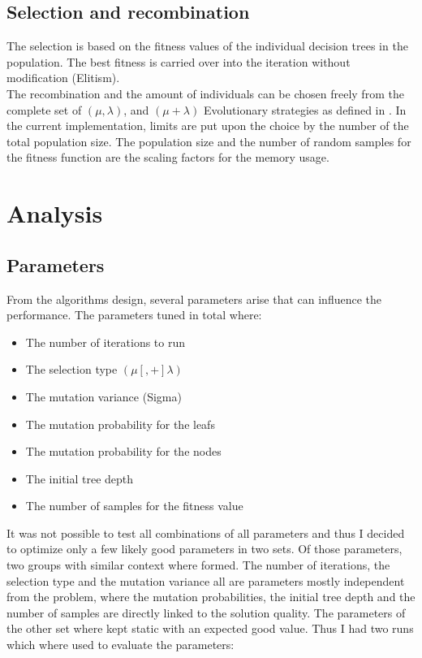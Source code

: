 \documentclass[conference]{IEEEtran}
\begin{document}
\subsection{Selection and recombination}
The selection is based on the fitness values of the individual decision trees in the population. The best fitness is carried over into the iteration without modification (Elitism).\\
The recombination and the amount of individuals can be chosen freely from the complete set of $(\mu ,\lambda)$, and $(\mu + \lambda)$ Evolutionary strategies as defined in \cite{rozenberg2011handbook}. In the current implementation, limits are put upon the choice by the number of the total population size. The population size and the number of random samples for the fitness function are the scaling factors for the memory usage. 


\section{Analysis}
\subsection{Parameters}
From the algorithms design, several parameters arise that can influence the performance. The parameters tuned in total where:

\begin{itemize}
\item The number of iterations to run
\item The selection type $(\mu [, +] \lambda)$
\item The mutation variance (Sigma)
\item The mutation probability for the leafs
\item The mutation probability for the nodes
\item The initial tree depth
\item The number of samples for the fitness value
\end{itemize}

It was not possible to test all combinations of all parameters and thus I decided to optimize only a few likely good parameters in two sets.
Of those parameters, two groups with similar context where formed. 
The number of iterations, the selection type and the mutation variance all are parameters mostly independent from the problem, where the mutation probabilities, the initial tree depth  and the number of samples are directly linked to the solution quality. The parameters of the other set where kept static with an expected good value. Thus I had two runs which where used to evaluate the parameters:
\end{document}

